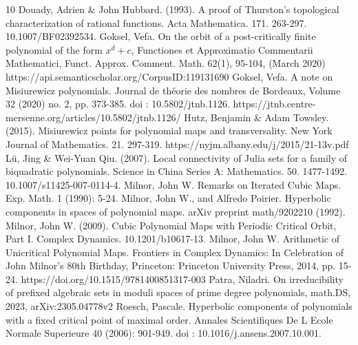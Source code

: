 \documentclass[reqno]{amsart}
\numberwithin{equation}{section}
\theoremstyle{plain}
\theoremstyle{definition}
\theoremstyle{definition}
\begin{document}
\begin{thebibliography}{10}
        Douady, Adrien \& John Hubbard. (1993). A proof of Thurston's topological characterization of rational functions. Acta Mathematica. 171. 263-297. 10.1007/BF02392534. 
        Goksel, Vefa.  On the orbit of a post-critically finite polynomial of the form  $x^d+c$, Functiones et Approximatio Commentarii Mathematici, Funct. Approx. Comment. Math. 62(1), 95-104, (March 2020) https://api.semanticscholar.org/CorpusID:119131690
        Goksel, Vefa. A note on Misiurewicz polynomials. Journal de théorie des nombres de Bordeaux, Volume 32 (2020) no. 2, pp. 373-385. doi : 10.5802/jtnb.1126. https://jtnb.centre-mersenne.org/articles/10.5802/jtnb.1126/
        Hutz, Benjamin \& Adam Towsley. (2015). Misiurewicz points for polynomial maps and transversality. New York Journal of Mathematics. 21. 297-319. https://nyjm.albany.edu/j/2015/21-13v.pdf
        Lü, Jing \& Wei-Yuan Qiu. (2007). Local connectivity of Julia sets for a family of biquadratic polynomials. Science in China Series A: Mathematics. 50. 1477-1492. 10.1007/s11425-007-0114-4.
        Milnor, John W.  Remarks on Iterated Cubic Maps.  Exp. Math. 1 (1990): 5-24.
        Milnor, John W., and Alfredo Poirier.  Hyperbolic components in spaces of polynomial maps. arXiv preprint math/9202210 (1992).
        Milnor, John W. (2009). Cubic Polynomial Maps with Periodic Critical Orbit, Part I. Complex Dynamics. 10.1201/b10617-13.
        Milnor, John W. Arithmetic of Unicritical Polynomial Maps. Frontiers in Complex Dynamics: In Celebration of John Milnor's 80th Birthday, Princeton: Princeton University Press, 2014, pp. 15-24. https://doi.org/10.1515/9781400851317-003
        Patra, Niladri. On irreducibility of prefixed algebraic sets in moduli spaces of prime degree polynomials, math.DS, 2023,  arXiv:2305.04778v2
        Roesch, Pascale.  Hyperbolic components of polynomials with a fixed critical point of maximal order.  Annales Scientifiques De L Ecole Normale Superieure 40 (2006): 901-949. doi : 10.1016/j.ansens.2007.10.001.
\end{thebibliography}
\end{document}
